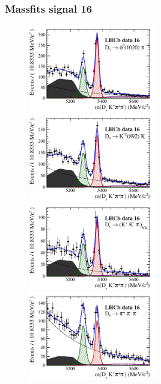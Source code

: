 \documentclass[]{beamer}
\begin{document}
\begin{frame}
\frametitle{Massfits signal 16}

\begin{figure}
\includegraphics[height=!,width=0.5\textwidth]{plots/signal_y16_phipi.pdf}
\includegraphics[height=!,width=0.5\textwidth]{plots/signal_y16_KsK.pdf}\\
\includegraphics[height=!,width=0.5\textwidth]{plots/signal_y16_KKpi_NR.pdf}
\includegraphics[height=!,width=0.5\textwidth]{plots/signal_y16_pipipi.pdf}
\end{figure}


\end{frame}
\end{document}
